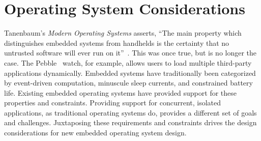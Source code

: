 \section{Operating System Considerations}
\label{os-considerations}

Tanenbaum's \emph{Modern Operating Systems} asserts, ``The main property which
distinguishes embedded systems from handhelds is the certainty that no untrusted
software will ever run on it''~\cite{tanenbaum}. This was once true, but is no
longer the case. The Pebble~\cite{pebble} watch, for example, allows users to
load multiple third-party applications dynamically.
Embedded systems have traditionally been categorized by event-driven computation,
minuscule sleep currents, and constrained battery life. Existing embedded operating systems
have provided support for these properties and constraints. Providing support for concurrent, isolated
applications, as traditional operating systems do, provides a different set
of goals and challenges.
Juxtaposing these requirements and constraints drives the design considerations
for new embedded operating system design.


%



